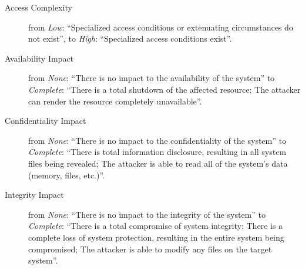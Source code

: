 \begin{description}	
	\item[Access Complexity] from \emph{Low}: ``Specialized access conditions or extenuating circumstances do not exist'', to \emph{High}: ``Specialized access conditions exist''.
	\item[Availability Impact] from \emph{None}: ``There is no impact to the availability of the system'' to \emph{Complete}: ``There is a total shutdown of the affected resource; The attacker can render the resource completely unavailable''.
	\item[Confidentiality Impact] from \emph{None}: ``There is no impact to the confidentiality of the system'' to \emph{Complete}: ``There is total information disclosure, resulting in all system files being revealed; The attacker is able to read all of the system's data (memory, files, etc.)''.
	\item[Integrity Impact] from \emph{None}: ``There is no impact to the integrity of the system'' to \emph{Complete}: ``There is a total compromise of system integrity; There is a complete loss of system protection, resulting in the entire system being compromised; The attacker is able to modify any files on the target system''.
\end{description}


